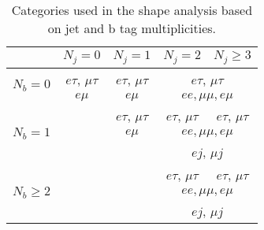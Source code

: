 \begin{table}[]
    \centering
    \setlength{\tabcolsep}{1.5em}
    \renewcommand{\arraystretch}{1.1}
    \caption{Categories used in the shape analysis based on jet and b
    tag multiplicities.}
    
    \begin{tabular}{l|c|c|c|c}
                                    & $N_{j} = 0$        & $N_{j} = 1$        & $N_{j} = 2$        & $N_{j} \geq 3$     \\
	\hline
    \multirow{2}{*}{$N_{b} = 0$}    & $e\tau$, $\mu\tau$ & $e\tau$, $\mu\tau$ & \multicolumn{2}{c}{$e\tau$, $\mu\tau$} \\
                                    & $e\mu$             & $e\mu$             & \multicolumn{2}{c}{$ee, \mu\mu, e\mu$} \\
	\hline
    \multirow{3}{*}{$N_{b} = 1$}    &                    & $e\tau$, $\mu\tau$ & $e\tau$, $\mu\tau$ & $e\tau$, $\mu\tau$ \\
	\cline{4-5}
                                    &                    & $e\mu$             & \multicolumn{2}{c}{$ee, \mu\mu, e\mu$}  \\
                                    &                    &                    & \multicolumn{2}{c}{$ej$, $\mu j$}  \\
	\hline
    \multirow{3}{*}{$N_{b} \geq 2$} & \multicolumn{2}{c|}{}                   & $e\tau$, $\mu\tau$ & $e\tau$, $\mu\tau$ \\
	\cline{4-5}
                                    & \multicolumn{2}{c|}{}                   & \multicolumn{2}{c}{$ee, \mu\mu, e\mu$}  \\
                                    & \multicolumn{2}{c|}{}                   & \multicolumn{2}{c}{$ej$, $\mu j$}  \\
	\hline
    \end{tabular}
    
    \label{tab:jet_categories}
\end{table}
